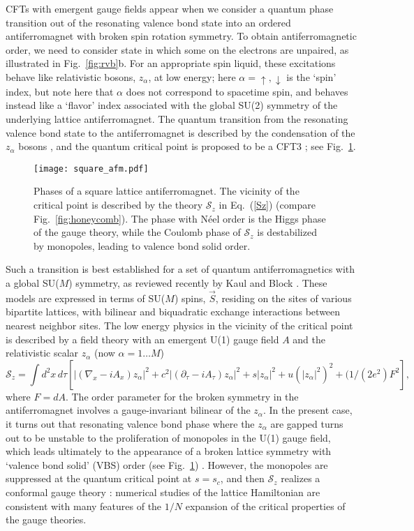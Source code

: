\documentclass[10pt, oneside]{book}
\def\be{\begin{equation}}
\def\ee{\end{equation}}
\begin{document}
\begin{doublespace}
CFTs with emergent gauge fields appear when we consider a quantum phase transition out of the resonating valence bond state into
an ordered antiferromagnet with broken spin rotation symmetry. To obtain antiferromagnetic order, we need to consider state in which some on the electrons are unpaired, as illustrated in Fig.~\ref{fig:rvb}b. For an appropriate spin liquid, these excitations behave like relativistic bosons, $z_\alpha$, at low energy; here $\alpha = \uparrow, \downarrow$ is the `spin' index, but note here that $\alpha$
does not correspond to spacetime spin, and behaves instead like a `flavor' index associated with the global SU(2) symmetry of the underlying lattice antiferromagnet. The quantum transition from the resonating valence bond state to the antiferromagnet
is described by the condensation of the $z_\alpha$ bosons \cite{NRSS89,NRSS90}, and the quantum critical point is proposed to be a CFT3 \cite{senthil1}; see Fig.~\ref{fig:square_afm}.
\begin{figure}
\centering
\texttt{[image: square\_afm.pdf]}
\caption{\label{fig:square_afm} Phases of a square lattice antiferromagnet. The vicinity of the critical point is described by the theory $\mathcal{S}_z$ in Eq.~(\ref{Sz})
(compare Fig.~\ref{fig:honeycomb}). The phase with N\'eel order is the Higgs phase of the gauge theory, while the Coulomb phase of $\mathcal{S}_z$ is destabilized by monopoles, leading
to valence bond solid order.}
\end{figure}
Such a transition is best established for a set of quantum antiferromagnetics with a global SU($M$) symmetry, as reviewed recently by 
Kaul and Block \cite{2015arXiv150205128K}. These models are expressed in terms of SU($M$) spins, $\vec{S}$, residing on the sites of various bipartite lattices, with 
bilinear and biquadratic 
exchange interactions between nearest neighbor sites. The low energy physics in the vicinity of the critical point is described by a field theory with an emergent U(1) gauge field $A$ and the relativistic scalar $z_\alpha$ (now $\alpha = 1\ldots M$)
\be
\mathcal{S}_z = \int d^2 x \, d\tau \left[ |(\nabla_x - i A_x) z_\alpha |^2 + c^2 |(\partial_\tau - i A_\tau) z_\alpha |^2 + s |z_\alpha|^2 + u \left(|z_\alpha|^2\right)^2 + (1/(2 e^2) F^2 \right], \label{Sz}
\ee
where $F = dA$. The order parameter for the broken symmetry in the antiferromagnet
involves a gauge-invariant bilinear of the $z_\alpha$. In the present case, it turns out that resonating valence bond phase
where the $z_\alpha$ are gapped turns out to be unstable to the proliferation of monopoles in the U(1) gauge field, which leads ultimately to the appearance of a broken lattice symmetry with `valence bond solid' (VBS) order (see Fig.~\ref{fig:square_afm}) \cite{NRSS89,NRSS90}.
However, the monopoles are suppressed at the quantum critical point at $s=s_c$, and then
 $\mathcal{S}_z$ realizes a conformal gauge theory \cite{senthil1}: numerical studies of the lattice Hamiltonian are consistent with many
features of the $1/N$ expansion of the critical properties of the gauge theories. 


\end{doublespace}
\end{document}

